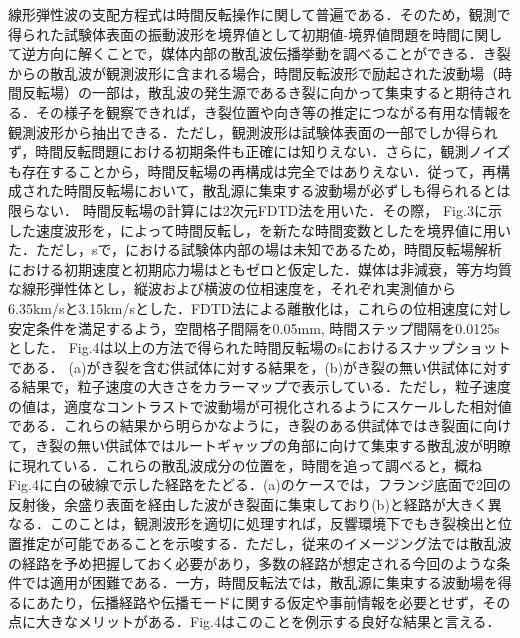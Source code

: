 線形弾性波の支配方程式は時間反転操作に関して普遍である．そのため，観測で得られた試験体表面の振動波形を境界値として初期値-境界値問題を時間に関して逆方向に解くことで，媒体内部の散乱波伝播挙動を調べることができる．き裂からの散乱波が観測波形に含まれる場合，時間反転波形で励起された波動場（時間反転場）の一部は，散乱波の発生源であるき裂に向かって集束すると期待される．その様子を観察できれば，き裂位置や向き等の推定につながる有用な情報を観測波形から抽出できる．ただし，観測波形は試験体表面の一部でしか得られず，時間反転問題における初期条件も正確には知りえない．さらに，観測ノイズも存在することから，時間反転場の再構成は完全ではありえない．従って，再構成された時間反転場において，散乱源に集束する波動場が必ずしも得られるとは限らない．
時間反転場の計算には2次元FDTD法を用いた．その際，  Fig.3に示した速度波形を，によって時間反転し，を新たな時間変数としたを境界値に用いた．ただし，sで，における試験体内部の場は未知であるため，時間反転場解析における初期速度と初期応力場はともゼロと仮定した．媒体は非減衰，等方均質な線形弾性体とし，縦波および横波の位相速度を，それぞれ実測値から6.35km/sと3.15km/sとした．FDTD法による離散化は，これらの位相速度に対し安定条件を満足するよう，空間格子間隔を0.05mm, 時間ステップ間隔を0.0125sとした．
Fig.4は以上の方法で得られた時間反転場のsにおけるスナップショットである． (a)がき裂を含む供試体に対する結果を，(b)がき裂の無い供試体に対する結果で，粒子速度の大きさをカラーマップで表示している．ただし，粒子速度の値は，適度なコントラストで波動場が可視化されるようにスケールした相対値である．これらの結果から明らかなように，き裂のある供試体ではき裂面に向けて，き裂の無い供試体ではルートギャップの角部に向けて集束する散乱波が明瞭に現れている．これらの散乱波成分の位置を，時間を追って調べると，概ねFig.4に白の破線で示した経路をたどる．(a)のケースでは，フランジ底面で2回の反射後，余盛り表面を経由した波がき裂面に集束しており(b)と経路が大きく異なる．このことは，観測波形を適切に処理すれば，反響環境下でもき裂検出と位置推定が可能であることを示唆する．ただし，従来のイメージング法では散乱波の経路を予め把握しておく必要があり，多数の経路が想定される今回のような条件では適用が困難である．一方，時間反転法では，散乱源に集束する波動場を得るにあたり，伝播経路や伝播モードに関する仮定や事前情報を必要とせず，その点に大きなメリットがある．Fig.4はこのことを例示する良好な結果と言える．
